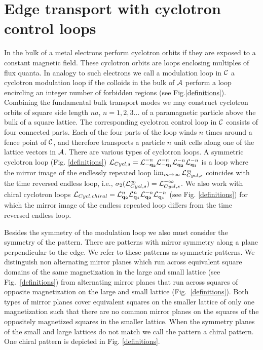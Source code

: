 \documentclass[12pt]{iopart}
\begin{document}
\section{Edge transport with cyclotron control loops}    

In the bulk of a metal electrons perform cyclotron orbits if they are exposed to a constant magnetic field. These cyclotron orbits are loops enclosing multiples of flux quanta. In analogy to such electrons we call a modulation loop in $\cal C$ a cyclotron modulation loop if the colloids in the bulk of $\cal A$ perform a loop encircling an integer number of forbidden regions (see Fig.\ref{definitions}).  
Combining the fundamental bulk transport modes we may construct cyclotron orbits of square side length $na$,
$n=1,2,3...$ of a paramagnetic particle above the bulk of a square lattice. The corresponding cyclotron control
loop in $\cal C$ consists of four connected parts. Each of the four parts of the loop
winds $n$ times around a fence point of $\cal C$, and therefore transports a particle $n$ unit cells
along one of the lattice vectors in ${\cal A}$. There are various types of cyclotron loops. A symmetric cyclotron loop (Fig. \ref{definitions})
${\cal L}_{Cycl,s}={\cal L}_{-\bf q_2}^{-n}{\cal L}_{-\bf q_1}^{-n}{\cal L}_{\bf q_2}^{-n}{\cal L}_{\bf q_1}^{-n}$ 
 is a loop where the mirror image 
of the endlessly repeated loop $\lim_{m\to\infty}{\cal L}_{Cycl,s}^m$ coincides with the time reversed endless loop, i.e.,
$\sigma_2({\cal L}_{Cycl,s}^\infty)={\cal L}_{Cycl,s}^{-\infty}$. We also work with chiral cyclotron loops 
${\cal L}_{Cycl,chiral}={\cal L}_{\bf q_2}^n{\cal L}_{\bf q_1}^n{\cal L}_{\bf q_2}^{-n}{\cal L}_{\bf q_1}^{-n}$
(see Fig. \ref{definitions})  for which the mirror image of the endless repeated loop differs from the time reversed endless loop.

Besides the symmetry of the modulation loop we also must consider the symmetry of the pattern. 
There are patterns with mirror symmetry along a plane perpendicular to the edge.
We refer to these patterns as symmetric patterns. We distinguish non alternating mirror
planes which run across equivalent square domains of the same magnetization in the large and small lattice (see Fig.~\ref{definitions})
from alternating mirror planes that run across squares of opposite magnetization on the large and small lattice (Fig.~\ref{definitions}).
Both types of mirror planes cover equivalent squares on the smaller lattice of only one magnetization such that there are no common mirror planes on the
squares of the oppositely magnetized squares in the smaller lattice. 
When the symmetry planes of the small and large lattices do not match we call the pattern a chiral pattern. One chiral pattern is depicted in Fig. \ref{definitions}. 
\end{document}
